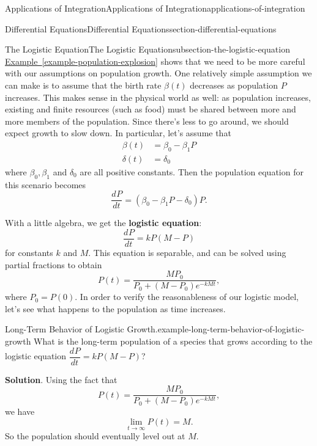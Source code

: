 \documentclass[oneside,10pt,]{book}
\newcommand{\terminology}[1]{\textbf{#1}}
\numberwithin{equation}{section}
\newcommand{\dv}[3][]{\dfrac{d^{#1} #2}{d #3^{#1}}}
\begin{document}
\begin{chapterptx}{Applications of Integration}{}{Applications of Integration}{}{}{applications-of-integration}
\begin{sectionptx}{Differential Equations}{}{Differential Equations}{}{}{section-differential-equations}
\begin{subsectionptx}{The Logistic Equation}{}{The Logistic Equation}{}{}{subsection-the-logistic-equation}
\hypertarget{p-743}{}%
\hyperref[example-population-explosion]{Example~\ref{example-population-explosion}} shows that we need to be more careful with our assumptions on population growth. One relatively simple assumption we can make is to assume that the birth rate \(\beta(t)\) decreases as population \(P\) increases. This makes sense in the physical world as well: as population increases, existing and finite resources (such as food) must be shared between more and more members of the population. Since there's less to go around, we should expect growth to slow down. In particular, let's assume that%
\begin{align*}
\beta(t) & = \beta_{0} - \beta_{1}P \\
\delta(t) & = \delta_{0} 
\end{align*}
where \(\beta_{0},\beta_{1}\) and \(\delta_{0}\) are all positive constants. Then the population equation for this scenario becomes%
\begin{equation*}
\dv{P}{t} = (\beta_{0} - \beta_{1}P - \delta_{0})P.
\end{equation*}
%
\par
\hypertarget{p-744}{}%
With a little algebra, we get the \terminology{logistic equation}:%
\begin{equation*}
\dv{P}{t} = kP(M-P)
\end{equation*}
for constants \(k\) and \(M\). This equation is separable, and can be solved using partial fractions to obtain%
\begin{equation*}
P(t) = \frac{MP_{0}}{P_{0} + (M - P_{0})e^{-kMt}},
\end{equation*}
where \(P_{0} = P(0)\). In order to verify the reasonableness of our logistic model, let's see what happens to the population as time increases.%
\begin{example}{Long-Term Behavior of Logistic Growth.}{example-long-term-behavior-of-logistic-growth}%
\hypertarget{p-745}{}%
What is the long-term population of a species that grows according to the logistic equation \(\dv{P}{t} = kP(M-P)\)?%
\par\smallskip%
\noindent\textbf{Solution}.\hypertarget{solution-156}{}\quad%
\hypertarget{p-746}{}%
Using the fact that%
\begin{equation*}
P(t) = \frac{MP_{0}}{P_{0} + (M - P_{0})e^{-kMt}},
\end{equation*}
we have%
\begin{equation*}
\lim_{t\to\infty}P(t) = M.
\end{equation*}
So the population should eventually level out at \(M\).%

\end{example}
\end{subsectionptx}
\end{sectionptx}
\end{chapterptx}
\end{document}
